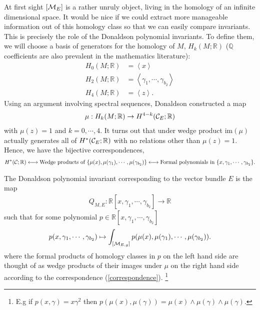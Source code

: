 \documentclass[12pt, onecolumn]{article}
\newenvironment{definition}[1][Definition]{\begin{trivlist}
\item[\hskip \labelsep {\bfseries #1}]}{\end{trivlist}}
\begin{document}
\vspace{5mm}

\noindent At first sight $[{\cal M}_{E}]$ is a rather unruly object, living in the homology of an infinite dimensional space.  It would be nice if we could extract more manageable information out of this homology class so that we can easily compare invariants.  This is precisely the role of the Donaldson polynomial invariants.  To define them, we will choose a basis of generators for the homology of $M$, $H_{k}(M;\mathbb{R})$ ($\mathbb{Q}$ coefficients are also prevalent in the mathematics literature):
\begin{align*}
H_{0}(M;\mathbb{R})&=\left \langle x \right \rangle\\
H_{2}(M;\mathbb{R})&=\left \langle \gamma_{1},\cdots,\gamma_{b_{2}} \right \rangle\\
H_{4}(M;\mathbb{R})&=\left \langle z \right \rangle.
\end{align*}
Using an argument involving spectral sequences, Donaldson constructed a map
\begin{align*}
\mu: H_{k}(M;\mathbb{R}) \rightarrow H^{4-k}({\cal C}_{E};\mathbb{R})
\end{align*}
with $\mu(z)=1$ and $k=0,\cdots,4$.  It turns out that under wedge product $\text{im}(\mu)$ actually generates all of $H^*({\cal C}_{E};\mathbb{R})$ with no relations other than $\mu(z)=1$.  Hence, we have the bijective correspondences,
\begin{align}
H^*({\cal C};\mathbb{R}) \longleftrightarrow \text{Wedge products of $\left\{\mu(x),\mu(\gamma_{1}),\cdots,\mu(\gamma_{b_{2}})\right\}$} \longleftrightarrow \text{Formal polynomials in $\left\{x,\gamma_{1},\cdots,\gamma_{b_{2}}\right\}$}.
\label{correspondence}
\end{align}

\begin{definition}
The Donaldson polynomial invariant corresponding to the vector bundle $E$ is the map
\begin{align*}
Q_{M,E}:\mathbb{R}[x,\gamma_{1},\cdots,\gamma_{b_{2}}] \rightarrow \mathbb{R}
\end{align*}
such that for some polynomial $p \in \mathbb{R}[x,\gamma_{1},\cdots,\gamma_{b_{2}}]$
\begin{align}
p(x,\gamma_{1},\cdots,\gamma_{b_{2}}) \mapsto \int_{[{\cal M}_{E,g}]}p(\mu(x),\mu(\gamma_{1}),\cdots,\mu(\gamma_{b_{2}})).
\label{eqn_Dpolyinvar}
\end{align}
where the formal products of homology classes in $p$ on the left hand side are thought of as wedge products of their images under $\mu$ on the right hand side according to the correspondence (\ref{correspondence}). \footnote{E.g if $p(x,\gamma)=x \gamma^2$ then $p(\mu(x),\mu(\gamma))=\mu(x)\wedge \mu(\gamma) \wedge \mu(\gamma)$.}
\end{definition}
\end{document}

